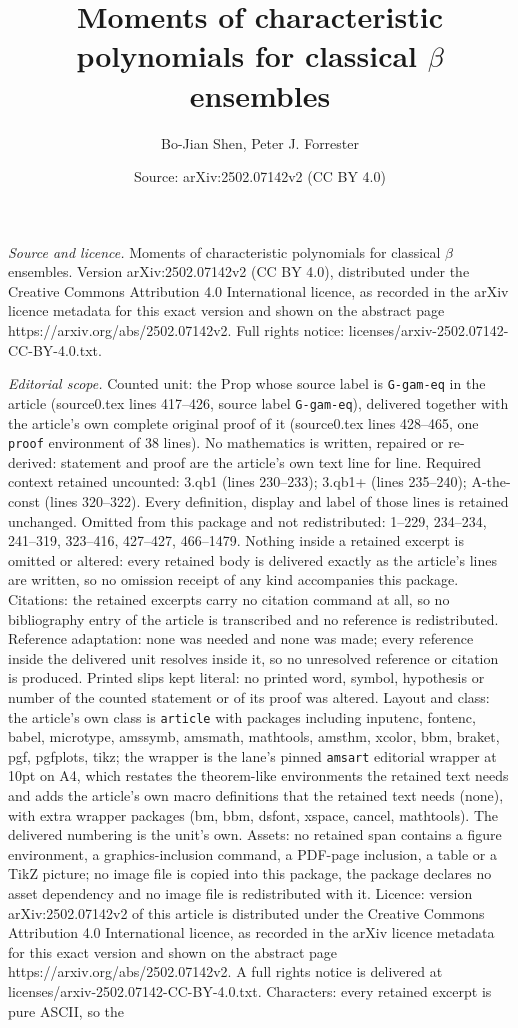 \documentclass[10pt,a4paper]{amsart}
\title[Moments of characteristic polynomials for classical $\beta$ ]{Moments of characteristic polynomials for classical $\beta$ ensembles}
\author{Bo-Jian Shen, Peter J. Forrester}
\date{Source: arXiv:2502.07142v2 (CC BY 4.0)}
\begin{document}
\maketitle

\noindent\emph{Source and licence.} Moments of characteristic polynomials for classical $\beta$ ensembles. Version arXiv:2502.07142v2 (CC BY 4.0), distributed under the Creative Commons Attribution 4.0 International licence, as recorded in the arXiv licence metadata for this exact version and shown on the abstract page https://arxiv.org/abs/2502.07142v2. Full rights notice: licenses/arxiv-2502.07142-CC-BY-4.0.txt.\par\smallskip

\noindent\textit{Editorial scope.} Counted unit: the Prop whose source label is \texttt{G-gam-eq} in the article (source0.tex lines 417--426, source label \texttt{G-gam-eq}), delivered together with the article's own complete original proof of it (source0.tex lines 428--465, one \texttt{proof} environment of 38 lines). No mathematics is written, repaired or re-derived: statement and proof are the article's own text line for line. Required context retained uncounted: 3.qb1 (lines 230--233); 3.qb1+ (lines 235--240); A-the-const (lines 320--322). Every definition, display and label of those lines is retained unchanged. Omitted from this package and not redistributed: 1--229, 234--234, 241--319, 323--416, 427--427, 466--1479. Nothing inside a retained excerpt is omitted or altered: every retained body is delivered exactly as the article's lines are written, so no omission receipt of any kind accompanies this package. Citations: the retained excerpts carry no citation command at all, so no bibliography entry of the article is transcribed and no reference is redistributed. Reference adaptation: none was needed and none was made; every reference inside the delivered unit resolves inside it, so no unresolved reference or citation is produced. Printed slips kept literal: no printed word, symbol, hypothesis or number of the counted statement or of its proof was altered. Layout and class: the article's own class is \texttt{article} with packages including inputenc, fontenc, babel, microtype, amssymb, amsmath, mathtools, amsthm, xcolor, bbm, braket, pgf, pgfplots, tikz; the wrapper is the lane's pinned \texttt{amsart} editorial wrapper at 10pt on A4, which restates the theorem-like environments the retained text needs and adds the article's own macro definitions that the retained text needs (none), with extra wrapper packages (bm, bbm, dsfont, xspace, cancel, mathtools). The delivered numbering is the unit's own. Assets: no retained span contains a figure environment, a graphics-inclusion command, a PDF-page inclusion, a table or a TikZ picture; no image file is copied into this package, the package declares no asset dependency and no image file is redistributed with it. Licence: version arXiv:2502.07142v2 of this article is distributed under the Creative Commons Attribution 4.0 International licence, as recorded in the arXiv licence metadata for this exact version and shown on the abstract page https://arxiv.org/abs/2502.07142v2. A full rights notice is delivered at licenses/arxiv-2502.07142-CC-BY-4.0.txt. Characters: every retained excerpt is pure ASCII, so the 
\end{document}
